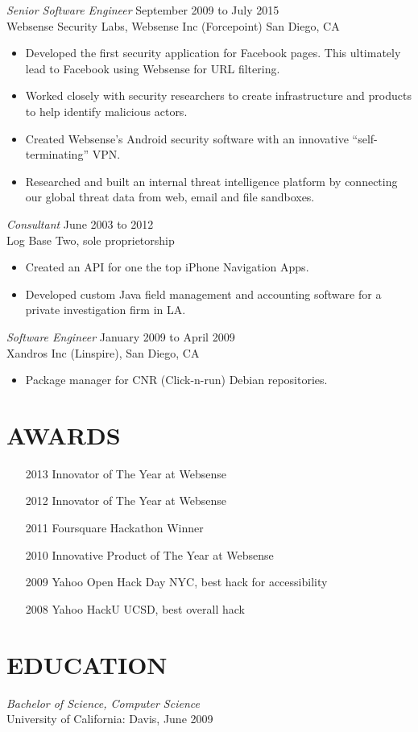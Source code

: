 \documentclass[margin]{res}
\begin{document}
\begin{resume}
{\sl Senior Software Engineer} \hfill September 2009 to July 2015 \\
Websense Security Labs, Websense Inc (Forcepoint) San Diego, CA
\begin{itemize} \itemsep -2pt
  \item Developed the first security application for Facebook pages. This ultimately lead to Facebook using Websense for URL filtering.
  \item Worked closely with security researchers to create infrastructure and products to help identify malicious actors.
  \item Created Websense's Android security software with an innovative ``self-terminating'' VPN.
  \item Researched and built an internal threat intelligence platform by connecting our global threat data from web, email and file sandboxes.
\end{itemize}

{\sl Consultant} \hfill  June 2003 to 2012 \\
Log Base Two, sole proprietorship
\begin{itemize}  \itemsep -2pt %
  \item Created an API for one the top iPhone Navigation Apps.
  \item Developed custom Java field management and accounting software for a private investigation firm in LA.
\end{itemize}
        
{\sl Software Engineer} \hfill  January 2009 to April 2009 \\
Xandros Inc (Linspire), San Diego, CA
\begin{itemize}  \itemsep -2pt %
  \item Package manager for CNR (Click-n-run) Debian repositories.
\end{itemize}

\section{AWARDS}
\begin{itemize} \itemsep -2pt
  \item[2013]{Innovator of The Year at Websense}
  \item[2012]{Innovator of The Year at Websense}
  \item[2011]{Foursquare Hackathon Winner}
  \item[2010]{Innovative Product of The Year at Websense}
  \item[2009]{Yahoo Open Hack Day NYC, best hack for accessibility} 
  \item[2008]{Yahoo HackU UCSD, best overall hack}
\end{itemize}
\section{EDUCATION} {\sl Bachelor of Science, Computer Science}\\
        University of California: Davis, June 2009\\

\end{resume}
\end{document}
